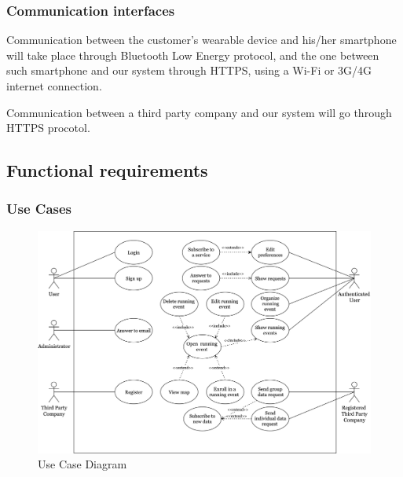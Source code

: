 \documentclass[../main.tex]{subfiles}
\begin{document}
\subsubsection{Communication interfaces}

Communication between the customer's wearable device and his/her smartphone will take place through Bluetooth Low Energy protocol, and the one between such smartphone and our system through HTTPS, using a Wi-Fi or 3G/4G internet connection.

Communication between a third party company and our system will go through HTTPS procotol.


\subsection{Functional requirements}
	\subsubsection{Use Cases}
	\begin{figure}[H]
		\centering
		\includegraphics[scale=.052]{images/useCaseTrackMe.png}
		\caption{Use Case Diagram \label{fig:Use Case Diagram}}
	\end{figure}
\end{document}

